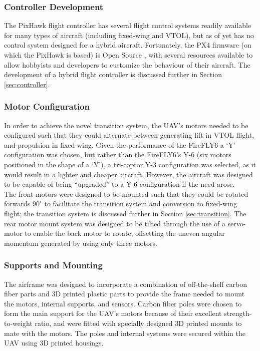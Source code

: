 \subsubsection*{Controller Development}
The PixHawk flight controller has several flight control systems readily available for many types of aircraft (including fixed-wing and VTOL), but as of yet has no control system designed for a hybrid aircraft. Fortunately, the PX4 firmware (on which the PixHawk is based) is Open Source \cite{ref:ardupilotgit}, with several resources available \cite{ref:firmware1,ref:firmware2} to allow hobbyists and developers to customize the behaviour of their aircraft. The development of a hybrid flight controller is discussed further in Section \ref{sec:controller}.

\subsubsection*{Motor Configuration}
In order to achieve the novel transition system, the UAV's motors needed to be configured such that they could alternate between generating lift in VTOL flight, and propulsion in fixed-wing. Given the performance of the FireFLY6 a `Y' configuration was chosen, but rather than the FireFLY6's Y-6 (six motors positioned in the shape of a `Y'), a tri-coptor Y-3 configuration  was selected, as it would result in a lighter and cheaper aircraft. However, the aircraft was designed to be capable of being ``upgraded'' to a Y-6 configuration if the need arose.\\

The front motors were designed to be mounted such that they could be rotated forwards $90^{\circ}$ to facilitate the transition system and conversion to fixed-wing flight; the transition system is discussed further in Section \ref{sec:transition}. The rear motor mount system was designed to be tilted through the use of a servo-motor to enable the back motor to rotate, offsetting the uneven angular momentum generated by using only three motors.
		
\subsubsection*{Supports and Mounting}
The airframe was designed to incorporate a combination of off-the-shelf carbon fiber parts and 3D printed plastic parts to provide the frame needed to mount the motors, internal supports, and sensors. Carbon fiber poles were chosen to form the main support for the UAV's motors because of their excellent strength-to-weight ratio, and were fitted with specially designed 3D printed mounts to mate with the motors. The poles and internal systems were secured within the UAV using 3D printed housings.
	
